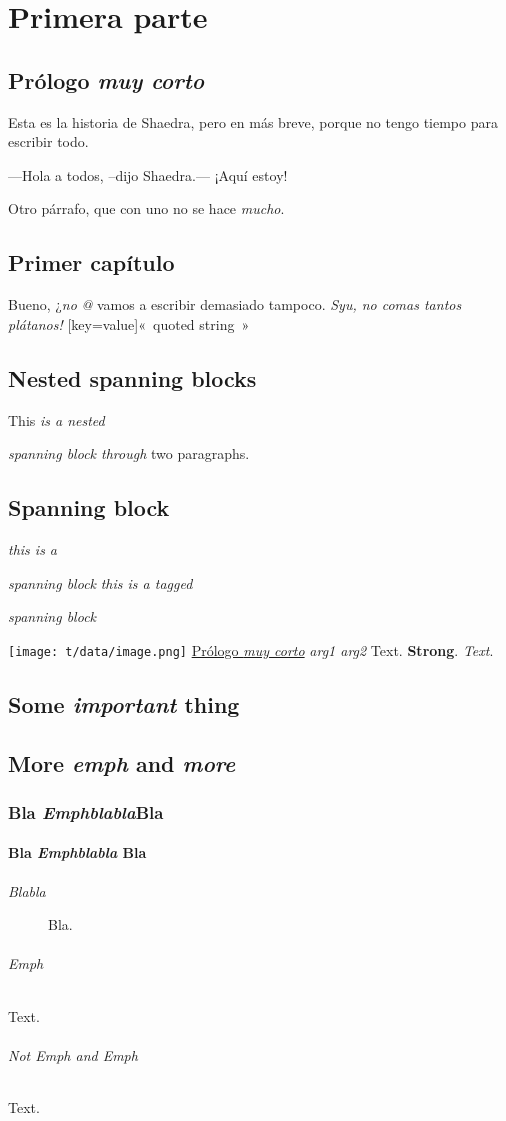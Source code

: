 \part{Primera parte}
\label{s:1}
\chapter{Prólogo \emph{muy corto}}
\label{s:2}
Esta es la historia de Shaedra, pero en más breve, porque no tengo tiempo para
escribir todo.

---Hola a todos, –dijo Shaedra.— ¡Aquí estoy!

Otro párrafo, que con uno no se hace
\textit{mucho}.

\chapter{Primer capítulo}
\label{s:3}
Bueno, ¿\emph{no}
\emph{@}
vamos a escribir demasiado tampoco.
\textit{Syu, no comas tantos plátanos!}
\textrm[key=value]{«~quoted string~»}

\chapter{Nested spanning blocks}
\label{s:4}
This
\emph{is a
\emph{nested}}

\emph{\emph{spanning}
block through}
two paragraphs.

\chapter{Spanning block}
\label{s:5}
\emph{this is a}

\emph{spanning block}
\textit{this is a tagged}

\textit{spanning block}

\texttt{[image: t/data/image.png]}
\hyperref[s:2]{Prólogo \emph{muy corto}}
\emph{arg1 arg2}
Text.
\textbf{Strong}.
\emph{\emph{Text}}.

\chapter{Some \emph{important} thing}
\label{s:6}
\chapter{More \emph{emph} and \emph{more}}
\label{s:7}
\section{Bla \textit{Emphblabla}Bla}
\label{s:8}
\subsection{Bla \textit{Emphblabla} Bla}
\label{s:9}
\begin{description}
\item[\emph{Blabla}] Bla.
\end{description}

\paragraph{\emph{Emph}}
Text.

\paragraph{Not Emph and \emph{Emph}}
Text.


